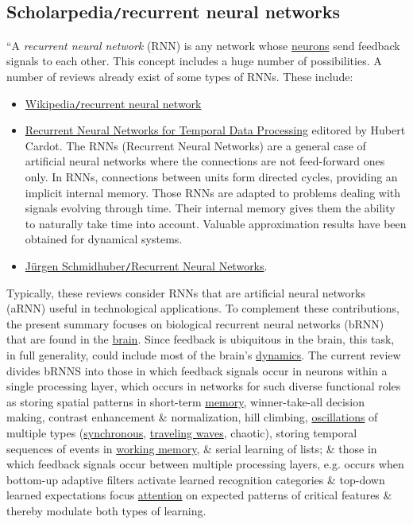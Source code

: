 \documentclass{article}
\begin{document}
\subsection{Scholarpedia{\tt/}recurrent neural networks}
``A {\it recurrent neural network} (RNN) is any network whose \href{http://www.scholarpedia.org/article/Neuron}{neurons} send feedback signals to each other. This concept includes a huge number of possibilities. A number of reviews already exist of some types of RNNs. These include:
\begin{itemize}
	\item \href{http://en.wikipedia.org/wiki/Recurrent_neural_network}{Wikipedia{\tt/}recurrent neural network}
	\item \href{https://www.intechopen.com/books/102}{Recurrent Neural Networks for Temporal Data Processing} editored by {\sc Hubert Cardot}. The RNNs (Recurrent Neural Networks) are a general case of artificial neural networks where the connections are not feed-forward ones only. In RNNs, connections between units form directed cycles, providing an implicit internal memory. Those RNNs are adapted to problems dealing with signals evolving through time. Their internal memory gives them the ability to naturally take time into account. Valuable approximation results have been obtained for dynamical systems.
	\item \href{http://www.idsia.ch/~juergen/rnn.html}{J\"urgen Schmidhuber{\tt/}Recurrent Neural Networks}.
\end{itemize}
Typically, these reviews consider RNNs that are artificial neural networks (aRNN) useful in technological applications. To complement these contributions, the present summary focuses on biological recurrent neural networks (bRNN) that are found in the \href{http://www.scholarpedia.org/article/Brain}{brain}. Since feedback is ubiquitous in the brain, this task, in full generality, could include most of the brain's \href{http://www.scholarpedia.org/article/Dynamical_Systems}{dynamics}. The current review divides bRNNS into those in which feedback signals occur in neurons within a single processing layer, which occurs in networks for such diverse functional roles as storing spatial patterns in short-term \href{http://www.scholarpedia.org/article/Memory}{memory}, winner-take-all decision making, contrast enhancement \& normalization, hill climbing, \href{http://www.scholarpedia.org/article/Periodic_Orbit}{oscillations} of multiple types (\href{http://www.scholarpedia.org/article/Synchronization}{synchronous}, \href{http://www.scholarpedia.org/article/Traveling_waves}{traveling waves}, chaotic), storing temporal sequences of events in \href{http://www.scholarpedia.org/article/Working_memory}{working memory}, \& serial learning of lists; \& those in which feedback signals occur between multiple processing layers, e.g. occurs when bottom-up adaptive filters activate learned recognition categories \& top-down learned expectations focus \href{http://www.scholarpedia.org/article/Attention}{attention} on expected patterns of critical features \& thereby modulate both types of learning.
\end{document}
